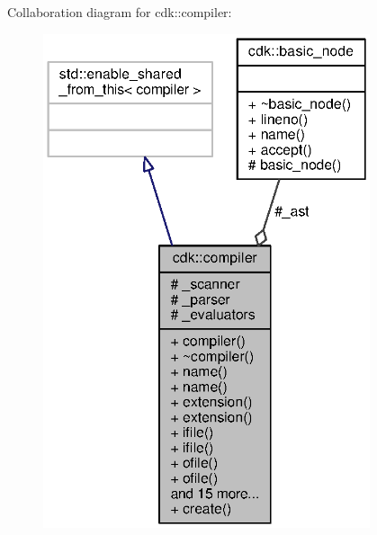 Collaboration diagram for cdk\+:\+:compiler\+:
\nopagebreak
\begin{figure}[H]
\begin{center}
\leavevmode
\includegraphics[width=272pt]{classcdk_1_1compiler__coll__graph}
\end{center}
\end{figure}
